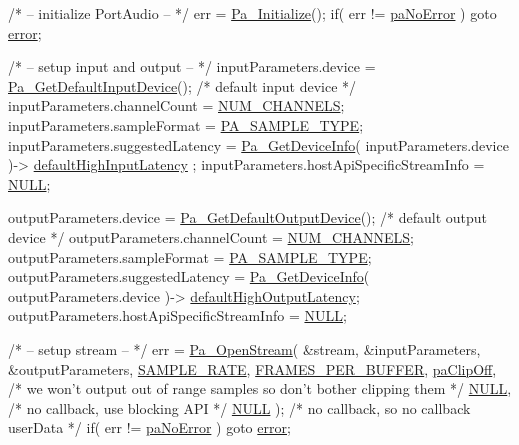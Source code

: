 \begin{DoxyCode}
\textcolor{comment}{/* -- initialize PortAudio -- */}
err = \hyperlink{portaudio_8h_abed859482d156622d9332dff9b2d89da}{Pa\_Initialize}();
\textcolor{keywordflow}{if}( err != \hyperlink{portaudio_8h_a2e45bf8b5145f131a91c128af2bdaec7aeb09d15a48b6c1034728a9c518cfe4ba}{paNoError} ) \textcolor{keywordflow}{goto} \hyperlink{sndfile__load_8m_a3a81ee160b23b01b04b7c08b35123218}{error};

\textcolor{comment}{/* -- setup input and output -- */}
inputParameters.device = \hyperlink{portaudio_8h_abf9f2f82da95553d5adb929af670f74b}{Pa\_GetDefaultInputDevice}(); \textcolor{comment}{/* default input device */}
inputParameters.channelCount = \hyperlink{paex__read__write__wire_8c_ae5597ce31d23d11493e6e674fe257d73}{NUM\_CHANNELS};
inputParameters.sampleFormat = \hyperlink{pa__fuzz_8c_a06e14a08d61a627aefbfe1f3ecd5db95}{PA\_SAMPLE\_TYPE};
inputParameters.suggestedLatency = \hyperlink{portaudio_8h_ac7d8e091ffc1d1d4a035704660e117eb}{Pa\_GetDeviceInfo}( inputParameters.device )->
      \hyperlink{struct_pa_device_info_a4214826038fcaf374beb9816024e6c9f}{defaultHighInputLatency} ;
inputParameters.hostApiSpecificStreamInfo = \hyperlink{getopt1_8c_a070d2ce7b6bb7e5c05602aa8c308d0c4}{NULL};

outputParameters.device = \hyperlink{portaudio_8h_adc955dfab007624000695c48d4f876dc}{Pa\_GetDefaultOutputDevice}(); \textcolor{comment}{/* default output device */}
outputParameters.channelCount = \hyperlink{paex__read__write__wire_8c_ae5597ce31d23d11493e6e674fe257d73}{NUM\_CHANNELS};
outputParameters.sampleFormat = \hyperlink{pa__fuzz_8c_a06e14a08d61a627aefbfe1f3ecd5db95}{PA\_SAMPLE\_TYPE};
outputParameters.suggestedLatency = \hyperlink{portaudio_8h_ac7d8e091ffc1d1d4a035704660e117eb}{Pa\_GetDeviceInfo}( outputParameters.device )->
      \hyperlink{struct_pa_device_info_a2a43dbc2b158806a937065bda037070e}{defaultHighOutputLatency};
outputParameters.hostApiSpecificStreamInfo = \hyperlink{getopt1_8c_a070d2ce7b6bb7e5c05602aa8c308d0c4}{NULL};

\textcolor{comment}{/* -- setup stream -- */}
err = \hyperlink{portaudio_8h_a443ad16338191af364e3be988014cbbe}{Pa\_OpenStream}(
          &stream,
          &inputParameters,
          &outputParameters,
          \hyperlink{sine_8cxx_a254783139625fe796c8924e0b04b1aee}{SAMPLE\_RATE},
          \hyperlink{sine_8cxx_a0ba5ca6cf467f019cb933a2f8bbaeb58}{FRAMES\_PER\_BUFFER},
          \hyperlink{portaudio_8h_a837b8a81be3f7e36c96003e0d8dcec12}{paClipOff},      \textcolor{comment}{/* we won't output out of range samples so don't bother clipping them */}
          \hyperlink{getopt1_8c_a070d2ce7b6bb7e5c05602aa8c308d0c4}{NULL}, \textcolor{comment}{/* no callback, use blocking API */}
          \hyperlink{getopt1_8c_a070d2ce7b6bb7e5c05602aa8c308d0c4}{NULL} ); \textcolor{comment}{/* no callback, so no callback userData */}
\textcolor{keywordflow}{if}( err != \hyperlink{portaudio_8h_a2e45bf8b5145f131a91c128af2bdaec7aeb09d15a48b6c1034728a9c518cfe4ba}{paNoError} ) \textcolor{keywordflow}{goto} \hyperlink{sndfile__load_8m_a3a81ee160b23b01b04b7c08b35123218}{error};


\end{DoxyCode}
